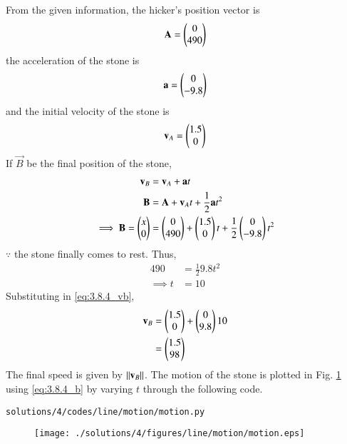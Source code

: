 From the given information, the hicker's position vector is 
\begin{align}
\mathbf {A} = \begin{pmatrix}0\\490\end{pmatrix}
\end{align}
the acceleration of the stone is 
\begin{align}
\mathbf a = \begin{pmatrix}0\\-9.8\end{pmatrix}
\end{align}
and the initial velocity of the stone is 
\begin{align}
\mathbf {v}_A = \begin{pmatrix}1.5\\0\end{pmatrix}
\end{align}
If $\vec{B}$ be the final position of the stone, 
\begin{align}
\label{eq:3.8.4_vb}
\mathbf {v}_B &=  \mathbf {v}_A  + \mathbf{a} t
\\
\mathbf{B} &= \mathbf{A}+\mathbf {v}_A t + \frac{1}{2}\mathbf {a} t^2
\\
\implies \mathbf{B}= \begin{pmatrix}x\\0\end{pmatrix}  &= \begin{pmatrix}0\\490\end{pmatrix} + \begin{pmatrix}1.5\\0\end{pmatrix}t +\frac{1}{2}\begin{pmatrix}0\\-9.8\end{pmatrix} t^2
\label{eq:3.8.4_b}
\end{align}
$\because$ the stone finally comes to rest.  Thus, 
\begin{align}
490 &= \frac{1}{2} 9.8t^2
\\
\implies t &= 10
\end{align}
Substituting in \eqref{eq:3.8.4_vb}, 
\begin{align}
\mathbf v_B &= \begin{pmatrix}1.5\\0\end{pmatrix} + \begin{pmatrix}0\\9.8\end{pmatrix}10 
\\
&= \begin{pmatrix}1.5\\98\end{pmatrix}
\end{align}
The final speed is given by $\left\lVert\mathbf{v}_B\right\rVert$.
The motion of the stone is plotted in Fig. \ref{fig:3.8.3_motion} using \eqref{eq:3.8.4_b} by varying $t$ through the following code.
%
\begin{lstlisting}
solutions/4/codes/line/motion/motion.py
\end{lstlisting}
\begin{figure}[!ht] \centering 
\texttt{[image: ./solutions/4/figures/line/motion/motion.eps]} \caption{} 
\label{fig:3.8.3_motion} \end{figure}

